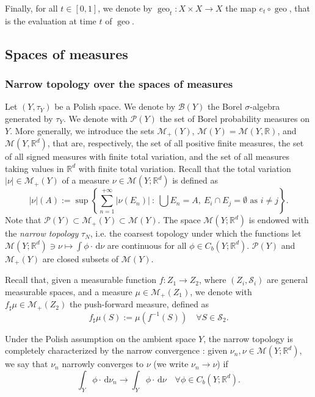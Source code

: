 \documentclass[10pt,leqno]{amsart}
\numberwithin{equation}{section}
\newcommand{\R}{\mathbb{R}}
\newcommand{\PP}{\mathcal{P}}
\renewcommand{\d}{\mathrm{d}}
\begin{document}
Finally, for all $t\in[0,1]$, we denote by $\operatorname{geo}_t:X \times X \to X$ the map $e_t\circ\operatorname{geo}$, that is the evaluation at time $t$ of $\operatorname{geo}$.

\subsection{Spaces of measures}
\subsubsection{Narrow topology over the spaces of measures}\label{subsub space of measures}
Let $(Y,\tau_Y)$ be a Polish space. 
We denote by $\mathcal B(Y)$
the Borel $\sigma$-algebra generated by $\tau_Y$.
We denote with $\PP(Y)$ the set of Borel probability measures on $Y$.
More generally, we introduce the sets $\mathcal{M}_+(Y)$, $\mathcal{M}(Y)
=\mathcal M(Y,\R)$, and $\mathcal{M}(Y,\R^d)$, that are, respectively, the set of all positive finite measures, the set of all signed measures with finite total variation, and the set of all measures taking values in $\R^d$ with finite total variation. 
Recall that the total variation $|\nu|\in \mathcal{M}_+(Y)$ of a measure $\nu \in \mathcal{M}(Y;\R^d)$ is defined as 
\[|\nu|(A) := \sup\left\{ \sum_{n=1}^{+\infty} |\nu(E_n)| \ : \ \bigcup E_n = A, \ E_i \cap E_j = \emptyset \text{ as } i\neq j \right\}.\]
Note that $\PP(Y) \subset \mathcal{M}_+(Y) \subset \mathcal{M}(Y)$.
The space $\mathcal{M}(Y;\R^d)$ is endowed with the \textit{narrow topology} $\tau_N$, i.e. the coarsest topology under which
the functions let $ \mathcal{M}(Y;\R^d) \ni \nu \mapsto \int \phi\cdot \,\d\nu$ are continuous for all $\phi\in C_b(Y;\R^d)$. $\PP(Y)$ and $\mathcal{M}_+(Y)$ are closed subsets of $\mathcal{M}(Y)$. 

Recall that, given a measurable function $f:Z_1 \to Z_2$, where $(Z_i,\mathcal{S}_i)$ are general measurable spaces, and a measure $\mu\in \mathcal{M}_+(Z_1)$, we denote with $f_\sharp\mu \in \mathcal{M}_+(Z_2)$ the push-forward measure, defined as 
\[f_\sharp\mu(S) := \mu(f^{-1}(S)) \quad \forall S\in \mathcal{S}_2.\]



Under the Polish assumption on the ambient space $Y$, the narrow topology is completely characterized by the narrow convergence \cite[ Theorem 8.9.4(ii)]{Bogachev07}: given $\nu_n,\nu \in \mathcal{M}(Y;\R^d)$, we say that $\nu_n$ narrowly converges to $\nu$ (we write $\nu_n \to \nu$) if 
\[\int_Y \phi \cdot \,\d\nu_n \to \int_Y \phi \cdot \,\d\nu \quad \forall \phi \in  C_b(Y;\R^d).\]
\end{document}
